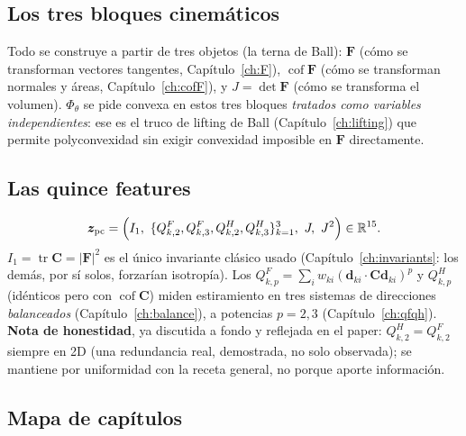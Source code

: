 \documentclass[11pt,a4paper]{article}
\newcommand{\Cof}{\operatorname{cof}}
\newcommand{\tr}{\operatorname{tr}}
\newcommand{\R}{\mathbb{R}}
\begin{document}
\subsection*{Los tres bloques cinem\'aticos}

Todo se construye a partir de tres objetos (la terna de Ball):
$\bm F$ (c\'omo se transforman vectores tangentes,
Cap\'itulo~\ref{ch:F}), $\Cof\bm F$ (c\'omo se transforman normales y
\'areas, Cap\'itulo~\ref{ch:cofF}), y $J=\det\bm F$ (c\'omo se
transforma el volumen). $\Phi_\theta$ se pide convexa en estos tres
bloques \emph{tratados como variables independientes}: ese es el
truco de lifting de Ball (Cap\'itulo~\ref{ch:lifting}) que permite
polyconvexidad sin exigir convexidad imposible en $\bm F$ directamente.

\subsection*{Las quince features}

\begin{equation}
 \bm z_{\rm pc}=\Big(I_1,\ \{Q_{k,2}^F,Q_{k,3}^F,Q_{k,2}^H,Q_{k,3}^H\}_{k=1}^3,\ J,\ J^2\Big)\in\R^{15}.
\end{equation}
$I_1=\tr\bm C=|\bm F|^2$ es el \'unico invariante cl\'asico usado
(Cap\'itulo~\ref{ch:invariants}: los dem\'as, por s\'i solos, forzar\'ian
isotrop\'ia). Los $Q_{k,p}^F=\sum_iw_{ki}(\bm d_{ki}\cdot\bm C\bm
d_{ki})^p$ y $Q_{k,p}^H$ (id\'enticos pero con $\Cof\bm C$) miden
estiramiento en tres sistemas de direcciones \emph{balanceados}
(Cap\'itulo~\ref{ch:balance}), a potencias $p=2,3$
(Cap\'itulo~\ref{ch:qfqh}). \textbf{Nota de honestidad}, ya discutida
a fondo y reflejada en el paper: $Q_{k,2}^H=Q_{k,2}^F$ siempre en 2D
(una redundancia real, demostrada, no solo observada); se mantiene
por uniformidad con la receta general, no porque aporte informaci\'on.

\subsection*{Mapa de cap\'itulos}
\end{document}
